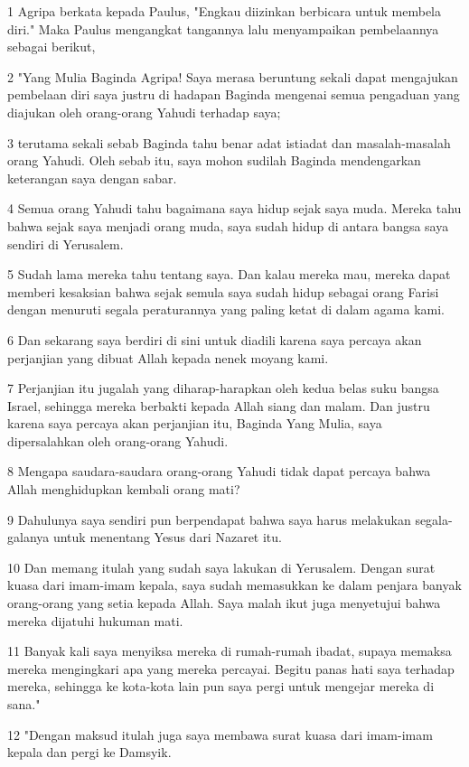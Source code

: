 \par 1 Agripa berkata kepada Paulus, "Engkau diizinkan berbicara untuk membela diri." Maka Paulus mengangkat tangannya lalu menyampaikan pembelaannya sebagai berikut,
\par 2 "Yang Mulia Baginda Agripa! Saya merasa beruntung sekali dapat mengajukan pembelaan diri saya justru di hadapan Baginda mengenai semua pengaduan yang diajukan oleh orang-orang Yahudi terhadap saya;
\par 3 terutama sekali sebab Baginda tahu benar adat istiadat dan masalah-masalah orang Yahudi. Oleh sebab itu, saya mohon sudilah Baginda mendengarkan keterangan saya dengan sabar.
\par 4 Semua orang Yahudi tahu bagaimana saya hidup sejak saya muda. Mereka tahu bahwa sejak saya menjadi orang muda, saya sudah hidup di antara bangsa saya sendiri di Yerusalem.
\par 5 Sudah lama mereka tahu tentang saya. Dan kalau mereka mau, mereka dapat memberi kesaksian bahwa sejak semula saya sudah hidup sebagai orang Farisi dengan menuruti segala peraturannya yang paling ketat di dalam agama kami.
\par 6 Dan sekarang saya berdiri di sini untuk diadili karena saya percaya akan perjanjian yang dibuat Allah kepada nenek moyang kami.
\par 7 Perjanjian itu jugalah yang diharap-harapkan oleh kedua belas suku bangsa Israel, sehingga mereka berbakti kepada Allah siang dan malam. Dan justru karena saya percaya akan perjanjian itu, Baginda Yang Mulia, saya dipersalahkan oleh orang-orang Yahudi.
\par 8 Mengapa saudara-saudara orang-orang Yahudi tidak dapat percaya bahwa Allah menghidupkan kembali orang mati?
\par 9 Dahulunya saya sendiri pun berpendapat bahwa saya harus melakukan segala-galanya untuk menentang Yesus dari Nazaret itu.
\par 10 Dan memang itulah yang sudah saya lakukan di Yerusalem. Dengan surat kuasa dari imam-imam kepala, saya sudah memasukkan ke dalam penjara banyak orang-orang yang setia kepada Allah. Saya malah ikut juga menyetujui bahwa mereka dijatuhi hukuman mati.
\par 11 Banyak kali saya menyiksa mereka di rumah-rumah ibadat, supaya memaksa mereka mengingkari apa yang mereka percayai. Begitu panas hati saya terhadap mereka, sehingga ke kota-kota lain pun saya pergi untuk mengejar mereka di sana."
\par 12 "Dengan maksud itulah juga saya membawa surat kuasa dari imam-imam kepala dan pergi ke Damsyik.
